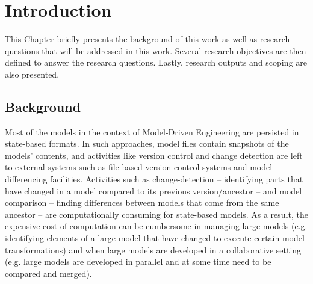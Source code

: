 \documentclass[12pt, a4paper]{report} \usepackage[titletoc]{appendix}
\begin{document}
\tableofcontents
{}

\listoffigures
\newpage
 
\listoftables
\newpage

\lstlistoflistings
\newpage

\chapter{Introduction}
\label{ch:introduction}
This Chapter briefly presents the background of this work as well as research questions that will be addressed in this work. Several research objectives are then defined to answer the research questions. Lastly, research outputs and scoping are also presented. 

\section{Background}
\label{sec:background}
Most of the models in the context of Model-Driven Engineering are persisted in state-based formats. In such approaches, model files contain snapshots of the models' contents, and activities like version control and change detection are left to external systems such as file-based version-control systems and model differencing facilities. Activities such as change-detection -- identifying parts that have changed in a model compared to its previous version/ancestor -- and model comparison -- finding differences between models that come from the same ancestor -- are computationally consuming for state-based models. As a result, the expensive cost of computation can be cumbersome in managing large models (e.g. identifying elements of a large model that have changed to execute certain model transformations) and when large models are developed in a collaborative setting (e.g. large models are developed in parallel and at some time need to be compared and merged).
\end{document}

